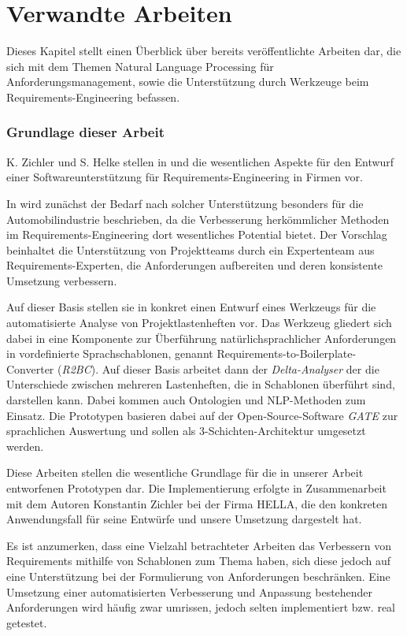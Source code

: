 \documentclass[12pt]{report}
\begin{document}
\section{Verwandte Arbeiten}
Dieses Kapitel stellt einen Überblick über bereits veröffentlichte Arbeiten dar, die sich mit dem Themen Natural Language Processing für Anforderungsmanagement, sowie die Unterstützung durch Werkzeuge beim Requirements-Engineering befassen. 

\subsubsection{Grundlage dieser Arbeit}
K. Zichler und S. Helke stellen in \cite{zh17} und \cite{zh19} die wesentlichen Aspekte für den Entwurf einer Softwareunterstützung für Requirements-Engineering in Firmen vor. 

In \cite{zh17} wird zunächst der Bedarf nach solcher Unterstützung besonders für die Automobilindustrie beschrieben, da die Verbesserung herkömmlicher Methoden im Requirements-Engineering dort wesentliches Potential bietet. Der Vorschlag beinhaltet die Unterstützung von Projektteams durch ein Expertenteam aus Requirements-Experten, die Anforderungen aufbereiten und deren konsistente Umsetzung verbessern. 

Auf dieser Basis stellen sie in \cite{zh19} konkret einen Entwurf eines Werkzeugs für die automatisierte Analyse von Projektlastenheften vor. Das Werkzeug gliedert sich dabei in eine Komponente zur Überführung natürlichsprachlicher Anforderungen in vordefinierte Sprachschablonen, genannt Requirements-to-Boilerplate-Converter (\textit{R2BC}). Auf dieser Basis arbeitet dann der \textit{Delta-Analyser} der die Unterschiede zwischen mehreren Lastenheften, die in Schablonen überführt sind, darstellen kann. Dabei kommen auch Ontologien und NLP-Methoden zum Einsatz. Die Prototypen basieren dabei auf der Open-Source-Software \textit{GATE} zur sprachlichen Auswertung und sollen als 3-Schichten-Architektur umgesetzt werden. 

Diese Arbeiten stellen die wesentliche Grundlage für die in unserer Arbeit entworfenen Prototypen dar. Die Implementierung erfolgte in Zusammenarbeit mit dem Autoren Konstantin Zichler bei der Firma HELLA, die den konkreten Anwendungsfall für seine Entwürfe und unsere Umsetzung dargestelt hat.

\vspace{12pt}

Es ist anzumerken, dass eine Vielzahl betrachteter Arbeiten das Verbessern von Requirements mithilfe von Schablonen zum Thema haben, sich diese jedoch auf eine Unterstützung bei der Formulierung von Anforderungen beschränken. Eine Umsetzung einer automatisierten Verbesserung und Anpassung bestehender Anforderungen wird häufig zwar umrissen, jedoch selten implementiert bzw. real getestet.
\end{document}

